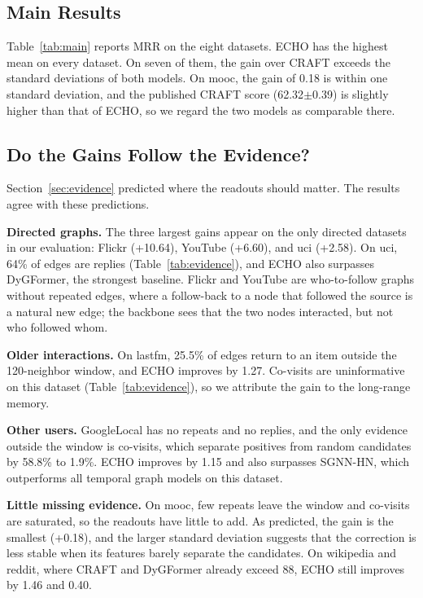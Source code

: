 \documentclass[twoside]{article}
\newcommand{\ours}{ECHO}
\begin{document}
\subsection{Main Results}

Table~\ref{tab:main} reports MRR on the eight datasets. \ours{} has the highest mean on every dataset. On seven of them, the gain over CRAFT exceeds the standard deviations of both models. On mooc, the gain of 0.18 is within one standard deviation, and the published CRAFT score (62.32$\pm$0.39) is slightly higher than that of \ours{}, so we regard the two models as comparable there.

\subsection{Do the Gains Follow the Evidence?}

Section~\ref{sec:evidence} predicted where the readouts should matter. The results agree with these predictions.

\textbf{Directed graphs.} The three largest gains appear on the only directed datasets in our evaluation: Flickr (+10.64), YouTube (+6.60), and uci (+2.58). On uci, 64\% of edges are replies (Table~\ref{tab:evidence}), and \ours{} also surpasses DyGFormer, the strongest baseline. Flickr and YouTube are who-to-follow graphs without repeated edges, where a follow-back to a node that followed the source is a natural new edge; the backbone sees that the two nodes interacted, but not who followed whom.

\textbf{Older interactions.} On lastfm, 25.5\% of edges return to an item outside the 120-neighbor window, and \ours{} improves by 1.27. Co-visits are uninformative on this dataset (Table~\ref{tab:evidence}), so we attribute the gain to the long-range memory.

\textbf{Other users.} GoogleLocal has no repeats and no replies, and the only evidence outside the window is co-visits, which separate positives from random candidates by 58.8\% to 1.9\%. \ours{} improves by 1.15 and also surpasses SGNN-HN, which outperforms all temporal graph models on this dataset.

\textbf{Little missing evidence.} On mooc, few repeats leave the window and co-visits are saturated, so the readouts have little to add. As predicted, the gain is the smallest (+0.18), and the larger standard deviation suggests that the correction is less stable when its features barely separate the candidates. On wikipedia and reddit, where CRAFT and DyGFormer already exceed 88, \ours{} still improves by 1.46 and 0.40.
\end{document}
